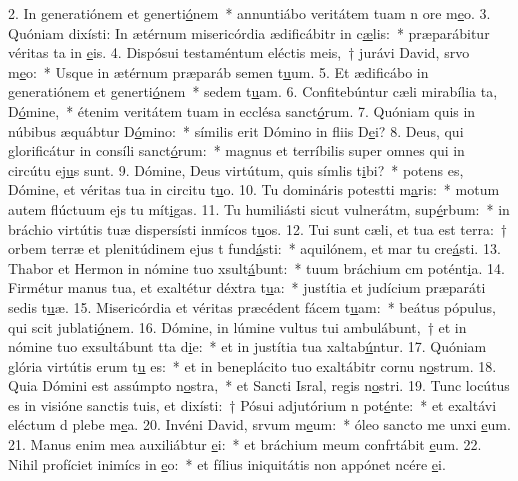 2. In generatiónem et generti\uline{ó}nem~* annuntiábo veritátem tuam n ore m\uline{e}o.
3. Quóniam dixísti: In ætérnum misericórdia ædificábitr in c\uline{æ}lis:~* præparábitur véritas ta in \uline{e}is.
4. Dispósui testaméntum eléctis meis,~† jurávi David, srvo m\uline{e}o:~* Usque in ætérnum præparáb semen t\uline{u}um.
5. Et ædificábo in generatiónem et generti\uline{ó}nem~* sedem t\uline{u}am.
6. Confitebúntur cæli mirabília ta, D\uline{ó}mine,~* étenim veritátem tuam in ecclésa sanct\uline{ó}rum.
7. Quóniam quis in núbibus æquábtur D\uline{ó}mino:~* símilis erit Dómino in fliis D\uline{e}i?
8. Deus, qui glorificátur in consíli sanct\uline{ó}rum:~* magnus et terríbilis super omnes qui in circútu ej\uline{u}s sunt.
9. Dómine, Deus virtútum, quis símlis t\uline{i}bi?~* potens es, Dómine, et véritas tua in circitu t\uline{u}o.
10. Tu domináris potestti m\uline{a}ris:~* motum autem flúctuum ejs tu mít\uline{i}gas.
11. Tu humiliásti sicut vulnerátm, sup\uline{é}rbum:~* in bráchio virtútis tuæ dispersísti inmícos t\uline{u}os.
12. Tui sunt cæli, et tua est terra:~† orbem terræ et plenitúdinem ejus t fund\uline{á}sti:~* aquilónem, et mar tu cre\uline{á}sti.
13. Thabor et Hermon in nómine tuo xsult\uline{á}bunt:~* tuum bráchium cm potént\uline{i}a.
14. Firmétur manus tua, et exaltétur déxtra t\uline{u}a:~* justítia et judícium præparáti sedis t\uline{u}æ.
15. Misericórdia et véritas præcédent fácem t\uline{u}am:~* beátus pópulus, qui scit jublati\uline{ó}nem.
16. Dómine, in lúmine vultus tui ambulábunt,~† et in nómine tuo exsultábunt tta d\uline{i}e:~* et in justítia tua xaltab\uline{ú}ntur.
17. Quóniam glória virtútis erum t\uline{u} es:~* et in beneplácito tuo exaltábitr cornu n\uline{o}strum.
18. Quia Dómini est assúmpto n\uline{o}stra,~* et Sancti Isral, regis n\uline{o}stri.
19. Tunc locútus es in visióne sanctis tuis, et dixísti:~† Pósui adjutórium n pot\uline{é}nte:~* et exaltávi eléctum d plebe m\uline{e}a.
20. Invéni David, srvum m\uline{e}um:~* óleo sancto me unxi \uline{e}um.
21. Manus enim mea auxiliábtur \uline{e}i:~* et bráchium meum confrtábit \uline{e}um.
22. Nihil profíciet inimícs in \uline{e}o:~* et fílius iniquitátis non appónet ncére \uline{e}i.
